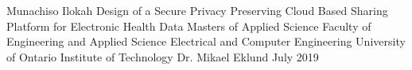 

\graphicspath{{./images/}}

\usepackage{hyperref}
\hypersetup{
    colorlinks,
    citecolor=black,
    filecolor=black,
    linkcolor=black,
    urlcolor=black
}



\thesisTitle
  {Munachiso Ilokah}
  {Design of a Secure Privacy Preserving Cloud Based Sharing Platform for Electronic Health Data}
  {Masters of Applied Science}
  {Faculty of Engineering and Applied Science}
  {Electrical and Computer Engineering}
  {University of Ontario Institute of Technology}
  {Dr. Mikael Eklund}
  {July}
  {2019}
  






\singlespacing
\tableofcontents
\listoffigures
\listoftables
\printglossary[style=list]

\clearpage
\doublespacing


















%


